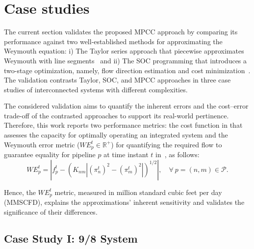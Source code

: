 \section{Case studies} \label{sec:case_study}
The current section validates the proposed MPCC approach by comparing its performance against two well-established methods for approximating the Weymouth equation: i) The Taylor series approach that piecewise approximates Weymouth with line segments~\cite{ORDOUDIS2019642} and ii) The SOC programming that introduces a two-stage optimization, namely, flow direction estimation and cost minimization~\cite{soc_paper}. The validation contrasts Taylor, SOC, and MPCC approaches in three case studies of interconnected systems with different complexities.

The considered validation aims to quantify the inherent errors and the cost--error trade-off of the contrasted approaches to support its real-world pertinence. Therefore, this work reports two performance metrics: the cost function in  that assesses the capacity for optimally operating an integrated system and the Weymouth error metric (${WE}_p^t\in\mathbb{R}^+$) for quantifying the required flow to guarantee equality for pipeline $p$ at time instant $t$ in~, as follows:
\begin{equation}
    {WE}_p^t = \left|f_{p}^t - \left(K_{nm}|(\pi_{n}^t)^2-(\pi_{m}^t)^2|\right)^{1/2}\right| , \quad \forall \ p =(n,m) \in\mathcal{P}.
    \label{eq:weymouth_cons}
\end{equation}

Hence, the ${WE}_p^t$ metric, measured in million standard cubic feet per day (MMSCFD), explains the approximations' inherent sensitivity and validates the significance of their differences.

\subsection{Case Study I: 9/8 System}


